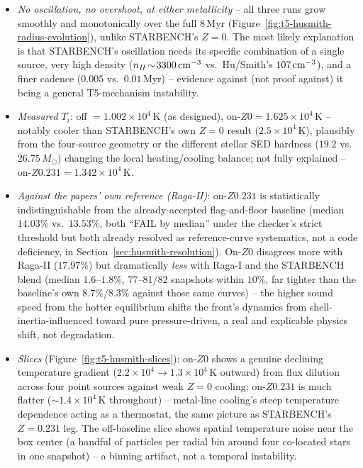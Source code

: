 \begin{itemize}
\item \emph{No oscillation, no overshoot, at either metallicity} --
  all three runs grow smoothly and monotonically over the full
  $8\,$Myr (Figure~\ref{fig:t5-husmith-radius-evolution}), unlike
  STARBENCH's $Z=0$. The most likely explanation is that STARBENCH's
  oscillation needs its specific combination of a single source, very
  high density ($n_H\!\sim\!3300\,{\rm cm^{-3}}$ vs.\ Hu/Smith's
  $107\,{\rm cm^{-3}}$), and a finer cadence ($0.005$ vs.\
  $0.01\,$Myr) -- evidence against (not proof against) it being a
  general T5-mechanism instability.
\item \emph{Measured $T_i$}: off $=1.002\times10^4\,$K (as designed),
  on-$Z0=1.625\times10^4\,$K -- notably cooler than STARBENCH's own
  $Z=0$ result ($2.5\times10^4\,$K), plausibly from the four-source
  geometry or the different stellar SED hardness ($19.2$ vs.\
  $26.75\,M_\odot$) changing the local heating/cooling balance; not
  fully explained -- on-$Z0.231=1.342\times10^4\,$K.
\item \emph{Against the papers' own reference (Raga-II)}: on-$Z0.231$
  is statistically indistinguishable from the already-accepted
  flag-and-floor baseline (median $14.03\%$ vs.\ $13.53\%$, both
  ``FAIL by median'' under the checker's strict threshold but both
  already resolved as reference-curve systematics, not a code
  deficiency, in Section~\ref{sec:husmith-resolution}). On-$Z0$
  disagrees more with Raga-II ($17.97\%$) but dramatically
  \emph{less} with Raga-I and the STARBENCH blend (median
  $1.6$--$1.8\%$, $77$--$81/82$ snapshots within $10\%$, far tighter
  than the baseline's own $8.7\%/8.3\%$ against those same curves) --
  the higher sound speed from the hotter equilibrium shifts the
  front's dynamics from shell-inertia-influenced toward pure
  pressure-driven, a real and explicable physics shift, not
  degradation.
\item \emph{Slices} (Figure~\ref{fig:t5-husmith-slices}): on-$Z0$
  shows a genuine declining temperature gradient ($2.2\times10^4\to
  1.3\times10^4\,$K outward) from flux dilution across four point
  sources against weak $Z=0$ cooling; on-$Z0.231$ is much flatter
  ($\sim\!1.4\times10^4\,$K throughout) -- metal-line cooling's steep
  temperature dependence acting as a thermostat, the same picture as
  STARBENCH's $Z=0.231$ leg. The off-baseline slice shows spatial
  temperature noise near the box center (a handful of particles per
  radial bin around four co-located stars in one snapshot) -- a
  binning artifact, not a temporal instability.
\end{itemize}

